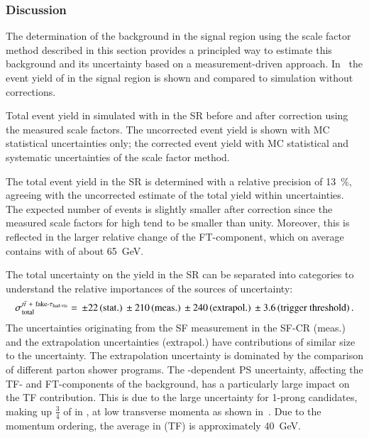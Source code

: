 \subsubsection{Discussion}

The determination of the \ttbarFakes background in the \hadhad signal
region using the scale factor method described in this section
provides a principled way to estimate this background and its
uncertainty based on a measurement-driven
approach. In~ the event yield of \ttbarFakes
in the \hadhad signal region is shown and compared to \ttbar
simulation without corrections.

\begin{table}[htbp]
  \centering

  \caption{Total event yield in simulated \ttbar with \faketauhadvis
    in the \hadhad SR before and after correction using the measured
    scale factors. The uncorrected event yield is shown with MC
    statistical uncertainties only; the corrected event yield with MC
    statistical and systematic uncertainties of the scale factor method.}%
  \label{tab:ttbarSF_yields}

  
\end{table}

The total \ttbarFakes event yield in the \hadhad SR is determined with
a relative precision of \SI{13}{\percent}, agreeing with the
uncorrected estimate of the total yield within uncertainties. The
expected number of \ttbarFakes events is slightly smaller after
correction since the measured scale factors for high \pT
\faketauhadvis tend to be smaller than unity. Moreover, this is
reflected in the larger relative change of the FT-component, which on
average contains \faketauhadvis with \pT of about \SI{65}{\GeV}.

The total uncertainty on the \ttbarFakes yield in the SR can be
separated into categories to understand the relative importances of
the sources of uncertainty:
\begin{align*}
  \sigma_\text{total}^{\ttbarFakes} = \valuesep\numerrt{22}{stat.}%
  \valuesep\numerrt{210}{meas.}%
  \valuesep\numerrt{240}{extrapol.}%
  \valuesep\numerrt{3.6}{trigger threshold} \,\text{.}
\end{align*}
The uncertainties originating from the SF measurement in the SF-CR
(meas.) and the extrapolation uncertainties (extrapol.) have
contributions of similar size to the uncertainty. The extrapolation
uncertainty is dominated by the comparison of different parton shower
programs. The \faketauhadvis \pT-dependent PS uncertainty, affecting
the TF- and FT-components of the background, has a particularly large
impact on the TF contribution. This is due to the large uncertainty
for 1-prong \faketauhadvis candidates, making up $\frac{3}{4}$ of
\faketauhadvis in \ttbar, at low transverse momenta as shown
in~. Due to the momentum ordering,
the average \faketauhadvis \pT in \ttbarFakes (TF) is approximately
\SI{40}{\GeV}.

